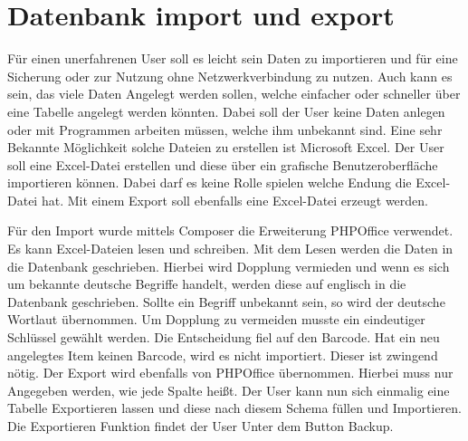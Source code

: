 \section{Datenbank import und export}
Für einen unerfahrenen User soll es leicht sein Daten zu importieren und für eine Sicherung oder zur Nutzung ohne Netzwerkverbindung zu nutzen. Auch kann es sein, das viele Daten Angelegt werden sollen, welche einfacher oder schneller über eine Tabelle angelegt werden könnten. Dabei soll der User keine Daten anlegen oder mit Programmen arbeiten müssen, welche ihm unbekannt sind. Eine sehr Bekannte Möglichkeit solche Dateien zu erstellen ist Microsoft Excel. Der User soll eine Excel-Datei erstellen und diese über ein grafische Benutzeroberfläche importieren können. Dabei darf es keine Rolle spielen welche Endung die Excel-Datei hat. Mit einem Export soll ebenfalls eine Excel-Datei erzeugt werden.

Für den Import wurde mittels Composer die Erweiterung PHPOffice verwendet. Es kann Excel-Dateien lesen und schreiben. Mit dem Lesen werden die Daten in die Datenbank geschrieben. Hierbei wird Dopplung vermieden und wenn es sich um bekannte deutsche Begriffe handelt, werden diese auf englisch in die Datenbank geschrieben. Sollte ein Begriff unbekannt sein, so wird der deutsche Wortlaut übernommen. Um Dopplung zu vermeiden musste ein eindeutiger Schlüssel gewählt werden. Die Entscheidung fiel auf den Barcode. Hat ein neu angelegtes Item keinen Barcode, wird es nicht importiert. Dieser ist zwingend nötig. Der Export wird ebenfalls von PHPOffice übernommen. Hierbei muss nur Angegeben werden, wie jede Spalte heißt. Der User kann nun sich einmalig eine Tabelle Exportieren lassen und diese nach diesem Schema füllen und Importieren. Die Exportieren Funktion findet der User Unter dem Button Backup.

